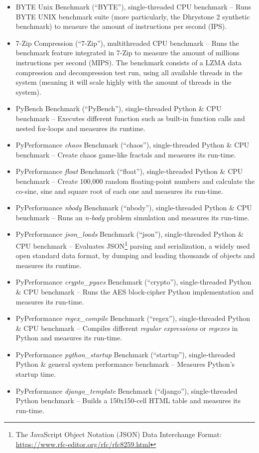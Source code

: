 \begin{itemize}
    \item BYTE Unix Benchmark (``BYTE''), single-threaded CPU benchmark -- Runs BYTE UNIX benchmark suite (more particularly, the Dhrystone 2 synthetic benchmark) to measure the amount of instructions per second (IPS). 
    \item 7-Zip Compression (``7-Zip''), multithreaded CPU benchmark -- Runs the benchmark feature integrated in 7-Zip to measure the amount of millions instructions per second (MIPS). The benchmark consists of a LZMA data compression and decompression test run, using all available threads in the system (meaning it will scale highly with the amount of threads in the system). 
    \item PyBench Benchmark (``PyBench''), single-threaded Python \& CPU benchmark -- Executes different function such as built-in function calls and nested for-loops and measures its runtime.
    \item PyPerformance \textit{chaos} Benchmark (``chaos''), single-threaded Python \& CPU benchmark -- Create chaos game-like fractals \cite{Jeffrey1992} and measures its run-time. 
    \item PyPerformance \textit{float} Benchmark (``float''), single-threaded Python \& CPU benchmark -- Create 100,000 random floating-point numbers and calculate the co-sine, sine and square root of each one and measures its run-time.
    \item PyPerformance \textit{nbody} Benchmark (``nbody''), single-threaded Python \& CPU benchmark -- Runs an \textit{n-body} problem simulation \cite{Playne2009} and measures its run-time.
    \item PyPerformance \textit{json\_loads} Benchmark (``json''), single-threaded Python \& CPU benchmark -- Evaluates \acf{JSON}\footnote{The JavaScript Object Notation (JSON) Data Interchange Format: \url{https://www.rfc-editor.org/rfc/rfc8259.html}} parsing and serialization, a widely used open standard data format, by dumping and loading thousands of objects and measures its runtime.
    \item PyPerformance \textit{crypto\_pyaes} Benchmark (``crypto''), single-threaded Python \& CPU benchmark -- Runs the AES block-cipher Python implementation and measures its run-time.
    \item PyPerformance \textit{regex\_compile} Benchmark (``regex''), single-threaded Python \& CPU benchmark -- Compiles different \textit{regular expressions} or \textit{regexes} in Python and measures its run-time.
    \item PyPerformance \textit{python\_startup} Benchmark (``startup''), single-threaded Python \& general system performance benchmark -- Measures Python's startup time.
    \item PyPerformance \textit{django\_template} Benchmark (``django''), single-threaded Python benchmark -- Builds a 150x150-cell HTML table and measures its run-time.
\end{itemize}

